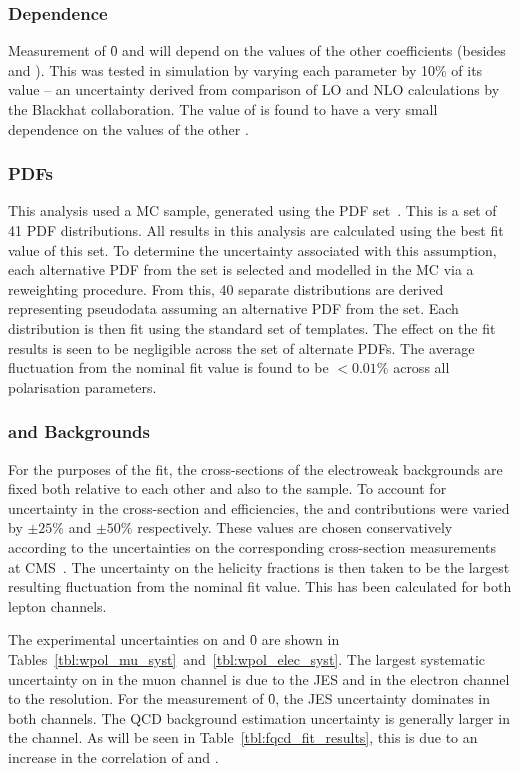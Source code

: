 \subsubsection{\Ai Dependence}
Measurement of \f0 and \fLmfR will depend on the values of the other \Ai
coefficients (besides \Azero and \Afour). This was tested in simulation by
varying each parameter \Ai by 10\% of its value -- an uncertainty derived from
comparison of \ac{LO} and \ac{NLO} calculations by the Blackhat
collaboration. The value of \fLmfR is found to have a very small dependence on
the values of the other \Ai.

\subsubsection{\aclp{PDF}}
\label{sec:wpol_syst_pdf}
This analysis used a \Wjets \ac{MC} sample, generated using the \cteqsixlone
\ac{PDF} set~\cite{cteq6l1}. This is a set of 41 \ac{PDF} distributions. All
results in this analysis are calculated using the best fit value of this set. To
determine the uncertainty associated with this assumption, each alternative
\ac{PDF} from the set is selected and modelled in the \ac{MC} via a
reweighting procedure. From this, 40 separate \LP distributions are derived
representing pseudodata assuming an alternative \ac{PDF} from the set. Each
distribution is then fit using the standard set of templates. The effect on the
fit results is seen to be negligible across the set of alternate \acp{PDF}. The
average fluctuation from the nominal fit value is found to be $< 0.01\%$ across
all polarisation parameters.

\subsubsection{\Zjets and \ttbar Backgrounds}
For the purposes of the fit, the cross-sections of the electroweak backgrounds
are fixed both relative to each other and also to the \Wjets sample. To account
for uncertainty in the cross-section and efficiencies, the \Zjets and \ttbar
contributions were varied by $\pm 25\%$ and $\pm 50\%$ respectively. These
values are chosen conservatively according to the uncertainties on the
corresponding cross-section measurements at
\ac{CMS}~\cite{cms_wz_pas,cms_ttbar_paper}. The uncertainty on the helicity
fractions is then taken to be the largest resulting fluctuation from the nominal
fit value. This has been calculated for both lepton channels.

The experimental uncertainties on \fLmfR and \f0 are shown in
Tables~\ref{tbl:wpol_mu_syst}~and~\ref{tbl:wpol_elec_syst}. The largest
systematic uncertainty on \fLmfR in the muon channel is due to the \ac{JES} and
in the electron channel to the \MET resolution. For the measurement of \f0, the
\ac{JES} uncertainty dominates in both channels. The \ac{QCD} background
estimation uncertainty is generally larger in the \PWm channel. As will be seen
in Table~\ref{tbl:fqcd_fit_results}, this is due to an increase in the
correlation of \fLmfR and \fQCD.


